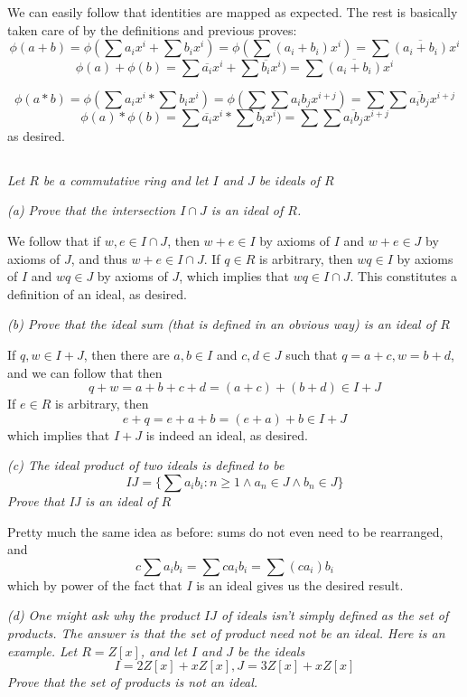 \documentclass[11pt,oneside,titlepage]{book}
\newcommand{\set}[1]{\{ #1 \}}
\begin{document}
We can easily follow that identities are mapped as expected. The rest
is basically taken care of by the definitions and previous proves:
$$\phi(a + b) = \phi(\sum {a_i x^i} + \sum {b_i x^i}) = \phi(\sum {(a_i + b_i) x^i}) =
\sum {\overline{(a_i + b_i)} x^i}$$
$$\phi(a)  + \phi(b) = \sum {\overline{a_i} x^i} + \sum {\overline{b_i} x^i}) =
\sum {\overline{(a_i + b_i)} x^i}$$


$$\phi(a * b) = \phi(\sum {a_i x^i} * \sum {b_i x^i}) = \phi(\sum{\sum {a_i b_j x^{i + j}}}) =
\sum{\sum {\overline{a_i b_j} x^{i + j}}}$$
$$\phi(a) * \phi(b) = \sum {\overline{a_i} x^i} * \sum {\overline{b_i} x^i})
= \sum{\sum {\overline{a_i b_j} x^{i + j}}}$$ as desired.

\subsection{}

\textit{Let $R$ be a commutative ring and let $I$ and $J$ be ideals of
$R$}

\textit{(a) Prove that the intersection $I \cap J$ is an ideal of
$R$.}

We follow that if $w, e \in I \cap J$, then $w + e \in I$ by axioms of
$I$ and $w + e \in J$ by axioms of $J$, and thus $w + e \in I \cap
J$. If $q \in R$ is arbitrary, then $wq \in I$ by axioms of $I$ and
$wq \in J$ by axioms of $J$, which implies that $wq \in I \cap
J$. This constitutes a definition of an ideal, as desired.

\textit{(b) Prove that the ideal sum (that is defined in an obvious
way) is an ideal of $R$ }

If $q, w \in I + J$, then there are $a, b \in I$ and $c, d \in J$ such
that $q = a + c, w = b + d$, and we can follow that then
$$q + w = a + b + c + d = (a + c) + (b + d) \in I + J$$
If $e \in R$ is arbitrary, then
$$e + q = e + a + b = (e + a) + b \in I + J$$
which implies that $I + J$ is indeed an ideal, as desired.

\textit{(c) The ideal product of two ideals is defined to be
  $$IJ = \set{\sum{a_i b_i}: n \geq 1 \land a_n \in J \land b_n \in J}$$
  Prove that IJ is an ideal of $R$}

Pretty much the same idea as before: sums do not even need to be
rearranged, and
$$c\sum{a_i b_i} = \sum{c a_i b_i} = \sum{(c a_i) b_i}$$
which by power of the fact that $I$ is an ideal gives us the desired
result.

\textit{(d) One might ask why the product $IJ$ of ideals isn't simply
defined as the set of products. The answer is that the set of product
need not be an ideal. Here is an example. Let $R = Z[x]$, and let $I$
and $J$ be the ideals
$$I = 2Z[x] + xZ[x], J = 3Z[x] + xZ[x]$$
Prove that the set of products is not an ideal.}
\end{document}
